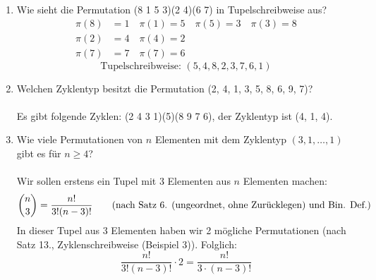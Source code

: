 \begin{enumerate}[label=(\alph*)]
        \item Wie sieht die Permutation (8 1 5 3)(2 4)(6 7) in Tupelschreibweise aus?
        \begin{align*}
        	\pi(8) &=1 \quad \pi(1)= 5 \quad \pi(5)=3 \quad \pi(3)=8\\
        	\pi(2) &=4 \quad \pi(4)=2\\
        	\pi(7) &=7 \quad \pi(7)=6
        \end{align*}
        \[\textrm{Tupelschreibweise: } (5,4,8,2,3,7,6,1)\]
        
        \item Welchen Zyklentyp besitzt die Permutation (2, 4, 1, 3, 5, 8, 6, 9, 7)?\\\\
        Es gibt folgende Zyklen: (2 4 3 1)(5)(8 9 7 6), der Zyklentyp ist (4, 1, 4).\\
        
        \item Wie viele Permutationen von $n$ Elementen mit dem Zyklentyp 
        $(3, 1, \ldots, 1)$ gibt es für $n \geq 4$?\\\\
        Wir sollen erstens ein Tupel mit 3 Elementen aus $n$ Elementen machen: 
        \[
        \binom{n}{3} = \frac{n!}{3!(n-3)!} 
        \textrm{\qquad(nach Satz 6. (ungeordnet, ohne Zur\"ucklegen) und Bin. Def.)}
        \]
        In dieser Tupel aus 3 Elementen haben wir 2 m\"ogliche Permutationen 
        (nach Satz 13., Zyklenschreibweise (Beispiel 3)). Folglich:
        \[\frac{n!}{3!(n-3)!} \cdot 2 = \frac{n!}{3\cdot(n-3)!}\]
    \end{enumerate}
